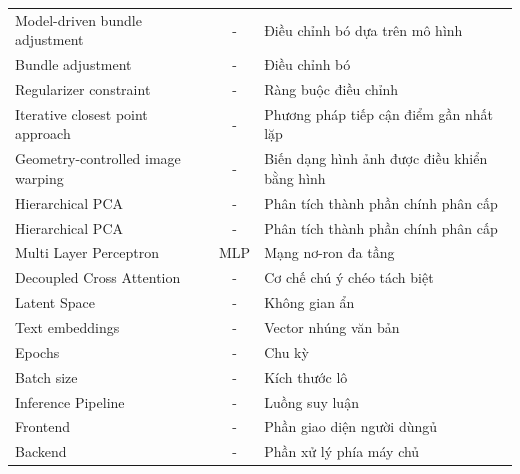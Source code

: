 \begin{longtable}{p{5.2cm}cp{8.2cm}}
    Model-driven bundle adjustment    & -                 & Điều chỉnh bó dựa trên mô hình                \\
    Bundle adjustment                 & -                 & Điều chỉnh bó                                 \\
    Regularizer constraint            & -                 & Ràng buộc điều chỉnh                          \\
    Iterative closest point approach  & -                 & Phương pháp tiếp cận điểm gần nhất lặp        \\
    Geometry-controlled image warping & -                 & Biến dạng hình ảnh được điều khiển bằng hình  \\
    Hierarchical PCA                  & -                 & Phân tích thành phần chính phân cấp           \\
    Hierarchical PCA                  & -                 & Phân tích thành phần chính phân cấp           \\
    Multi Layer Perceptron            & MLP               & Mạng nơ-ron đa tầng                           \\
    Decoupled Cross Attention         & -                 & Cơ chế chú ý chéo tách biệt                   \\
    Latent Space                      & -                 & Không gian ẩn                                 \\
    Text embeddings                   & -                 & Vector nhúng văn bản                          \\
    Epochs                            & -                 & Chu kỳ                                        \\
    Batch size                        & -                 & Kích thước lô                                 \\
    Inference Pipeline                & -                 & Luồng suy luận                                \\
    Frontend                          & -                 & Phần giao diện người dùngủ                    \\
    Backend                           & -                 & Phần xử lý phía máy chủ                       \\
\end{longtable}
